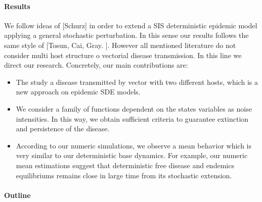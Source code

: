 \paragraph{Results}
	We follow ideas of [Schurz] in order to extend a SIS deterministic epidemic 
	model applying a general stochastic perturbation. In this sense our results 
	follows the same style of [Tosun, Cai, Gray. ]. However all mentioned
	literature do not consider multi host structure o vectorial disease 
	transmission. In this line we direct our research. Concretely, 
	our main contributions are:
	\begin{itemize}
		\item 
			The study a disease transmitted by vector with two different hosts, which 
			is a new approach on epidemic SDE models.
		\item
			We consider a family of functions dependent on the states variables
			as noise intensities. In this way, we obtain sufficient criteria to 
			guarantee extinction and persistence of the disease.
		\item 
			According to our numeric simulations, we observe a mean behavior
			which is very similar to our deterministic base dynamics.
			For example, our numeric mean estimations suggest that deterministic 
			free disease and endemics equilibriums remains close in large time from
			its stochastic extension.
	\end{itemize}
	
\paragraph{Outline}